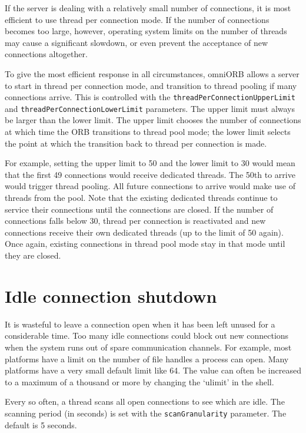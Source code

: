 \documentclass[11pt,oneside,a4paper]{book}
\newcommand{\code}[1]{\texttt{#1}}
\newcommand{\dsc}{\discretionary{}{}{}}
\begin{document}
If the server is dealing with a relatively small number of
connections, it is most efficient to use thread per connection mode.
If the number of connections becomes too large, however, operating
system limits on the number of threads may cause a significant
slowdown, or even prevent the acceptance of new connections
altogether.

To give the most efficient response in all circumstances, omniORB
allows a server to start in thread per connection mode, and transition
to thread pooling if many connections arrive. This is controlled with
the \code{threadPerConnection\dsc{}UpperLimit} and
\code{threadPerConnectionLowerLimit} parameters. The upper limit must
always be larger than the lower limit. The upper limit chooses the
number of connections at which time the ORB transitions to thread pool
mode; the lower limit selects the point at which the transition back
to thread per connection is made.

For example, setting the upper limit to 50 and the lower limit to 30
would mean that the first 49 connections would receive dedicated
threads. The 50th to arrive would trigger thread pooling. All future
connections to arrive would make use of threads from the pool. Note
that the existing dedicated threads continue to service their
connections until the connections are closed. If the number of
connections falls below 30, thread per connection is reactivated and
new connections receive their own dedicated threads (up to the limit
of 50 again). Once again, existing connections in thread pool mode
stay in that mode until they are closed.


\section{Idle connection shutdown}
\label{sec:connShutdown}

It is wasteful to leave a connection open when it has been left unused
for a considerable time. Too many idle connections could block out new
connections when the system runs out of spare communication channels.
For example, most platforms have a limit on the number of file handles
a process can open. Many platforms have a very small default limit
like 64. The value can often be increased to a maximum of a thousand
or more by changing the `ulimit' in the shell.

Every so often, a thread scans all open connections to see which are
idle. The scanning period (in seconds) is set with the
\code{scanGranularity} parameter. The default is 5 seconds.
\end{document}
